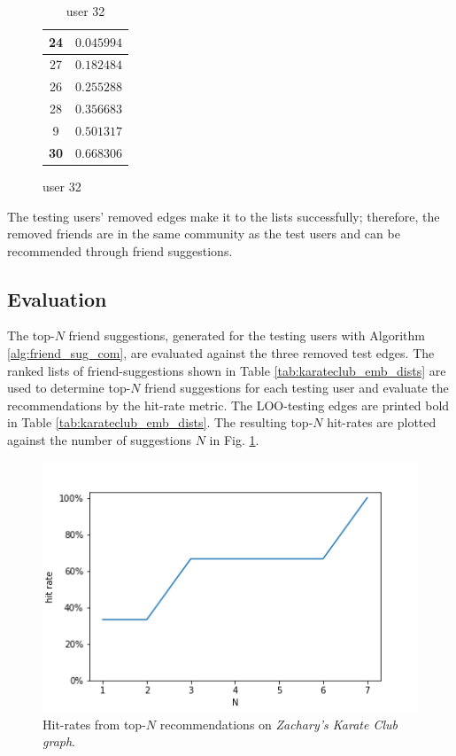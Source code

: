 \documentclass[conference]{IEEEtran}
\begin{document}
\begin{table}
\begin{subfigure}{.4\textwidth}
\begin{tabular}{ c | r }
            \hline
            24          & $0.045994$ \\
            \hline
            27          & $0.182484$ \\
            \hline
            26          & $0.255288$ \\
            \hline
            28          & $0.356683$ \\
            \hline
            9           & $0.501317$ \\
            \hline
            \textbf{30} & $0.668306$ \\
        \end{tabular}
        \caption{user 32}
    \end{subfigure}
\end{table}

The testing users' removed edges make it to the lists successfully; therefore, the removed friends are in the same community as the test users and can be recommended through friend suggestions.

\subsection{Evaluation}

The top-$N$ friend suggestions, generated for the testing users with Algorithm \ref{alg:friend_sug_com}, are evaluated against the three removed test edges.
The ranked lists of friend-suggestions shown in Table \ref{tab:karateclub_emb_dists} are used to determine top-$N$ friend suggestions for each testing user and evaluate the recommendations by the hit-rate metric. The LOO-testing edges are printed bold in Table \ref{tab:karateclub_emb_dists}. The resulting top-$N$ hit-rates are plotted against the number of suggestions $N$ in Fig. \ref{fig:karateclub_hitrates}.

\begin{figure}[htbp]
    \centering
    \includegraphics[width=.4\textwidth]{images/karateclub/hit_rates.png}
    \caption{Hit-rates from top-$N$ recommendations on \textit{Zachary’s Karate Club graph}.}
    \label{fig:karateclub_hitrates}
\end{figure}
\end{document}
